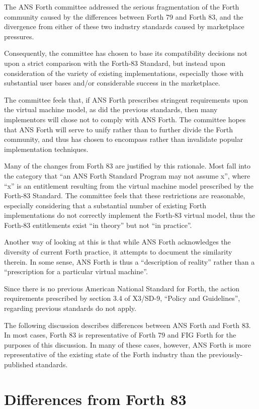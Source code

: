 The ANS Forth committee addressed the serious fragmentation of the
Forth community caused by the differences between Forth 79 and
Forth 83, and the divergence from either of these two industry
standards caused by marketplace pressures.

Consequently, the committee has chosen to base its compatibility
decisions not upon a strict comparison with the Forth-83 Standard,
but instead upon consideration of the variety of existing
implementations, especially those with substantial user bases and/or
considerable success in the marketplace.

The committee feels that, if ANS Forth prescribes stringent
requirements upon the virtual machine model, as did the previous
standards, then many implementors will chose not to comply with
ANS Forth. The committee hopes that ANS Forth will serve to unify
rather than to further divide the Forth community, and thus has
chosen to encompass rather than invalidate popular implementation
techniques.

Many of the changes from Forth 83 are justified by this rationale.
Most fall into the category that ``an ANS Forth Standard Program may
not assume x'', where ``x'' is an entitlement resulting from the
virtual machine model prescribed by the Forth-83 Standard. The
committee feels that these restrictions are reasonable, especially
considering that a substantial number of existing Forth implementations
do not correctly implement the Forth-83 virtual model, thus the Forth-83
entitlements exist ``in theory'' but not ``in practice''.

Another way of looking at this is that while ANS Forth acknowledges
the diversity of current Forth practice, it attempts to document the
similarity therein. In some sense, ANS Forth is thus a ``description
of reality'' rather than a ``prescription for a particular virtual
machine''.

Since there is no previous American National Standard for Forth, the
action requirements prescribed by section 3.4 of X3/SD-9,
``Policy and Guidelines'', regarding previous standards do not apply.

The following discussion describes differences between ANS Forth and
Forth 83. In most cases, Forth 83 is representative of Forth 79 and
FIG Forth for the purposes of this discussion. In many of these cases,
however, ANS Forth is more representative of the existing state of the
Forth industry than the previously-published standards.


\section{Differences from Forth 83} %

